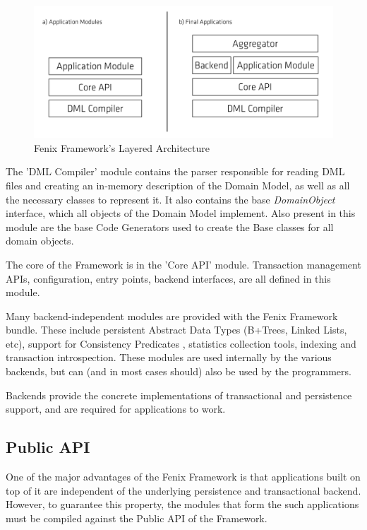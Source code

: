 \begin{figure}
\centering
\includegraphics[width=0.8\linewidth]{ff-arch}
\caption{Fenix Framework's Layered Architecture}
\label{fig:ff-arch}
\end{figure}

The 'DML Compiler' module contains the parser responsible for reading
DML files and creating an in-memory description of the Domain Model,
as well as all the necessary classes to represent it. It also contains
the base {\it DomainObject} interface, which all objects of the Domain
Model implement. Also present in this module are the base Code
Generators used to create the Base classes for all domain
objects.

The core of the Framework is in the 'Core API' module. Transaction
management APIs, configuration, entry points, backend interfaces, are
all defined in this module.

Many backend-independent modules are provided with the Fenix Framework
bundle. These include persistent Abstract Data Types (B+Trees, Linked
Lists, etc), support for Consistency
Predicates \cite{JoaoCoutinhoNeves2011}, statistics collection tools,
indexing and transaction introspection. These modules are used
internally by the various backends, but can (and in most cases should)
also be used by the programmers.

Backends provide the concrete implementations of transactional and
persistence support, and are required for applications to work.

\subsection{Public API}

One of the major advantages of the Fenix Framework is that
applications built on top of it are independent of the underlying
persistence and transactional backend. However, to guarantee this
property, the modules that form the such applications must be compiled
against the Public API of the Framework.

